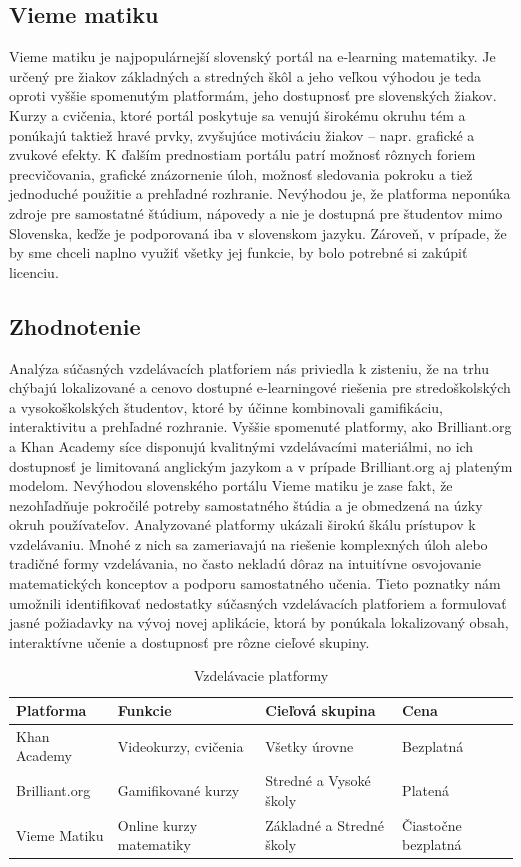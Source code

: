 \subsection{Vieme matiku}
Vieme matiku je najpopulárnejší slovenský portál na e-learning matematiky.
 Je určený pre žiakov základných a stredných škôl a jeho veľkou výhodou je teda oproti vyššie spomenutým platformám, jeho dostupnosť pre slovenských žiakov.
 Kurzy a cvičenia, ktoré portál poskytuje sa venujú širokému okruhu tém a ponúkajú taktiež hravé prvky, zvyšujúce motiváciu žiakov – napr. grafické a zvukové efekty.
 K ďalším prednostiam portálu patrí možnosť rôznych foriem precvičovania, grafické znázornenie úloh, možnosť sledovania pokroku a tiež jednoduché použitie a prehľadné rozhranie.
 Nevýhodou je, že platforma neponúka zdroje pre samostatné štúdium, nápovedy a nie je dostupná pre študentov mimo Slovenska, keďže je podporovaná iba v slovenskom jazyku.
 Zároveň, v prípade, že by sme chceli naplno využiť všetky jej funkcie, by bolo potrebné si zakúpiť licenciu.\cite{viemeto}
\subsection{Zhodnotenie}
Analýza súčasných vzdelávacích platforiem nás priviedla k zisteniu, že na trhu chýbajú lokalizované a cenovo dostupné e-learningové riešenia pre stredoškolských a vysokoškolských študentov, ktoré by účinne kombinovali gamifikáciu, interaktivitu a prehľadné rozhranie. 
Vyššie spomenuté platformy, ako Brilliant.org a Khan Academy síce disponujú kvalitnými vzdelávacími materiálmi, no ich dostupnosť je limitovaná anglickým jazykom a v prípade Brilliant.org aj plateným modelom.
Nevýhodou slovenského portálu Vieme matiku je zase fakt, že nezohľadňuje pokročilé potreby samostatného štúdia a je obmedzená na úzky okruh používateľov.
Analyzované platformy ukázali širokú škálu prístupov k vzdelávaniu. 
Mnohé z nich sa zameriavajú na riešenie komplexných úloh alebo tradičné formy vzdelávania, no často nekladú dôraz na intuitívne osvojovanie matematických konceptov a podporu samostatného učenia.
Tieto poznatky nám umožnili identifikovať nedostatky súčasných vzdelávacích platforiem a formulovať jasné požiadavky na vývoj novej aplikácie, ktorá by ponúkala lokalizovaný obsah, interaktívne učenie a dostupnosť pre rôzne cieľové skupiny.

\begin{table}[htbp]
\caption{Vzdelávacie platformy}
\label{vzdelavaciePlatformy}
\begin{tabularx}{\textwidth}{|X|X|X|X|}
\hline
\textbf{Platforma} & \textbf{Funkcie} & \textbf{Cieľová skupina} & \textbf{Cena} \\ \hline
Khan Academy & Videokurzy, cvičenia & Všetky úrovne & Bezplatná \\ \hline
Brilliant.org & Gamifikované kurzy & Stredné a Vysoké školy & Platená \\ \hline
Vieme Matiku & Online kurzy matematiky & Základné a Stredné školy & Čiastočne bezplatná \\ \hline
\end{tabularx}
\end{table}

